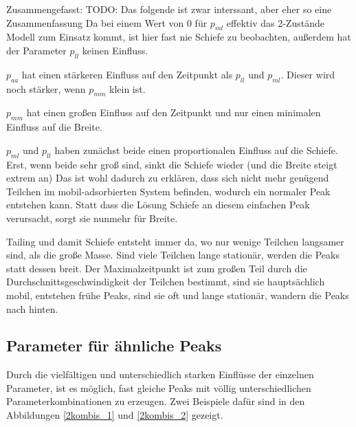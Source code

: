 Zusammengefasst: 
TODO: Das folgende ist zwar interssant, aber eher so eine Zusammenfassung
Da bei einem Wert von $0$ für $p_{ml}$ effektiv das 2-Zustände Modell zum Einsatz kommt, ist hier fast nie Schiefe zu beobachten, außerdem hat der Parameter $p_{ll}$ keinen Einfluss. 

$p_{aa}$ hat einen stärkeren Einfluss auf den Zeitpunkt als $p_{ll}$ und $p_{ml}$. Dieser wird noch stärker, wenn $p_{mm}$ klein ist.

$p_{mm}$ hat einen großen Einfluss auf den Zeitpunkt und nur einen minimalen Einfluss auf die Breite.

$p_{ml}$ und $p_{ll}$ haben zunächst beide einen proportionalen Einfluss auf die Schiefe. Erst, wenn beide sehr groß sind, sinkt die Schiefe wieder (und die Breite steigt extrem an) Das ist wohl dadurch zu erklären, dass sich nicht mehr genügend Teilchen im mobil-adsorbierten System befinden, wodurch ein normaler Peak entstehen kann. Statt dass die Lösung Schiefe an diesem einfachen Peak verursacht, sorgt sie nunmehr für Breite.

Tailing und damit Schiefe entsteht immer da, wo nur wenige Teilchen langsamer sind, als die große Masse. Sind viele Teilchen lange stationär, werden die Peaks statt dessen breit. Der Maximalzeitpunkt ist zum großen Teil durch die Durchschnittsgeschwindigkeit der Teilchen bestimmt, sind sie hauptsächlich mobil, entstehen frühe Peaks, sind sie oft und lange stationär, wandern die Peaks nach hinten. 


\subsection{Parameter für ähnliche Peaks}
\label{chapter:eva_gleichePeaks}

Durch die vielfältigen und unterschiedlich starken Einflüsse der einzelnen Parameter, ist es möglich, fast gleiche Peaks mit völlig unterschiedlichen Parameterkombinationen zu erzeugen. Zwei Beispiele dafür sind in den Abbildungen \ref{2kombis_1} und \ref{2kombis_2} gezeigt.

